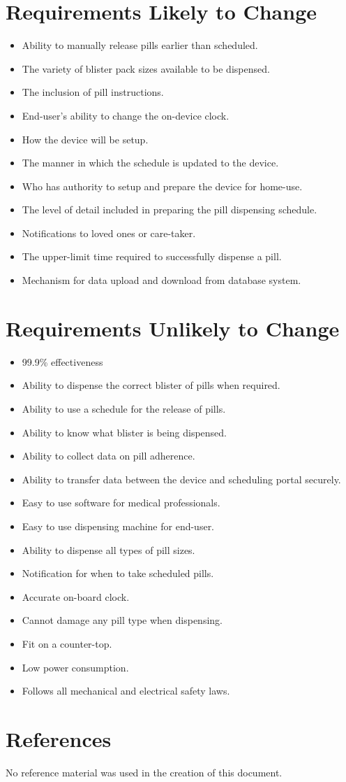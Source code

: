 \documentclass[12pt,titlepage]{article}
\begin{document}
\section{Requirements Likely to Change}
\begin{itemize}
    \item Ability to manually release pills earlier than scheduled.
    \item The variety of blister pack sizes available to be dispensed.
    \item The inclusion of pill instructions.
    \item End-user's ability to change the on-device clock.
    \item How the device will be setup.
    \item The manner in which the schedule is updated to the device.
    \item Who has authority to setup and prepare the device for home-use.
    \item The level of detail included in preparing the pill dispensing schedule.
    \item Notifications to loved ones or care-taker.
    \item The upper-limit time required to successfully dispense a pill.
    \item Mechanism for data upload and download from database system.
\end{itemize}

\section{Requirements Unlikely to Change}
\begin{itemize}
    \item 99.9\% effectiveness
    \item Ability to dispense the correct blister of pills when required.
    \item Ability to use a schedule for the release of pills.
    \item Ability to know what blister is being dispensed.
    \item Ability to collect data on pill adherence.
    \item Ability to transfer data between the device and scheduling portal securely.
    \item Easy to use software for medical professionals.
    \item Easy to use dispensing machine for end-user.
    \item Ability to dispense all types of pill sizes.
    \item Notification for when to take scheduled pills.
    \item Accurate on-board clock.
    \item Cannot damage any pill type when dispensing.
    \item Fit on a counter-top.
    \item Low power consumption.
    \item Follows all mechanical and electrical safety laws.
\end{itemize}
\section{References}
No reference material was used in the creation of this document.
\end{document}
